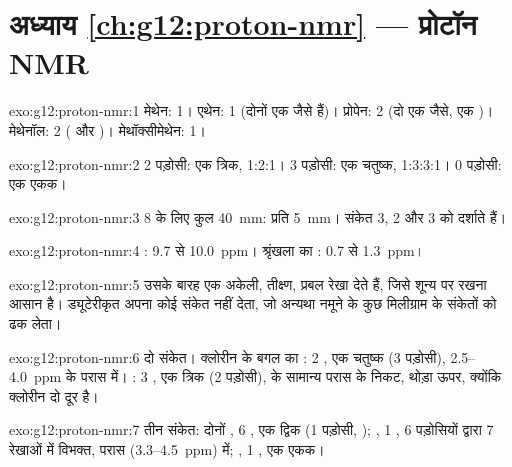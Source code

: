\section*{अध्याय \ref{ch:g12:proton-nmr} --- प्रोटॉन NMR}

\begin{solution}{exo:g12:proton-nmr:1}
मेथेन: 1। एथेन: 1 (दोनों  एक जैसे हैं)। प्रोपेन: 2 (दो
 एक जैसे, एक )। मेथेनॉल: 2 ( और )।
मेथॉक्सीमेथेन: 1।
\end{solution}

\begin{solution}{exo:g12:proton-nmr:2}
2 पड़ोसी: एक त्रिक, 1:2:1। 3 पड़ोसी: एक चतुष्क, 1:3:3:1।
0 पड़ोसी: एक एकक।
\end{solution}

\begin{solution}{exo:g12:proton-nmr:3}
8  के लिए कुल \qty{40}{mm}: प्रति  \qty{5}{mm}। संकेत
3, 2 और 3  को दर्शाते हैं।
\end{solution}

\begin{solution}{exo:g12:proton-nmr:4}
: 9.7 से \qty{10.0}{ppm}। श्रृंखला का : 0.7 से
\qty{1.3}{ppm}।
\end{solution}

\begin{solution}{exo:g12:proton-nmr:5}
उसके बारह  एक अकेली, तीक्ष्ण, प्रबल रेखा देते हैं, जिसे
शून्य पर रखना आसान है। ड्यूटेरीकृत  अपना कोई  संकेत नहीं
देता, जो अन्यथा नमूने के कुछ मिलीग्राम के संकेतों को ढक लेता।
\end{solution}

\begin{solution}{exo:g12:proton-nmr:6}
दो संकेत। क्लोरीन के बगल का : 2 , एक चतुष्क (3
पड़ोसी), 2.5--\qty{4.0}{ppm} के परास में। : 3 , एक
त्रिक (2 पड़ोसी),  के सामान्य परास के निकट, थोड़ा ऊपर,
क्योंकि क्लोरीन दो  दूर है।
\end{solution}

\begin{solution}{exo:g12:proton-nmr:7}
तीन संकेत: दोनों , 6 , एक द्विक (1
पड़ोसी, ); , 1 , 6 पड़ोसियों द्वारा
7 रेखाओं में विभक्त,  परास (3.3--\qty{4.5}{ppm}) में;
, 1 , एक एकक।
\end{solution}

